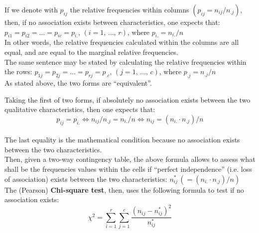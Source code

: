 \begin{frame}
  \vspace*{.25cm}
  If we denote with $ p_{ij} $ the relative frequencies within columns $ (p_{ij} = n_{ij}/n_{.j}) $, then, if no association exists between characteristics, one expects that: $ p_{i1} = p_ {i2} = \dots = p_{ic} = p_{i.} $, $ (i = 1, \, \dots, \, r) $, where $ p_{i.} = n_{i.}/n $\\
  \vspace*{.25cm}
  In other words, the relative frequencies calculated within the columns are all equal, and are equal to the marginal relative frequencies. \\
  \vspace*{.5cm}
  The same sentence may be stated by calculating the relative frequencies within the rows: $ p_{1j} = p_{2j} = \dots = p_{rj} = p_{.c} $, $(j = 1, \, \dots, \, c) $, where $ p_{.j} = n_{.j}/n $\\
  \vspace*{.5cm}
  As stated above, the two forms are ``equivalent''.
\end{frame}

\begin{frame}
  \vspace*{.05cm}
  Taking the first of two forms, if absolutely no association exists between the two qualitative characteristics, then one expects that:\\
  \vspace*{-.3cm}
  $$ p_{ij}=p_{i.} \Longleftrightarrow n_{ij}/n_{.j} = n_{i.}/n  \Longleftrightarrow n_{ij} = (n_{i.} \cdot n_{.j})/n $$\\
  \vspace*{.1cm}
  The last equality is the mathematical condition because no association exists between the two characteristics.\\
  Then, given a two-way contingency table, the above formula allows to assess what shall be the frequencies values within the cells if ``perfect independence'' (i.e. loss of association) exists between the two characteristics: $ n_{ij}^* \, ( = (n_{i.} \cdot n_{.j})/n) $\\
  The (Pearson) \textbf{Chi-square test}, then, uses the following formula to test if no association exists:
  $$ \chi^2 = \sum_{i=1}^r \sum_{j=1}^c{\frac{(n_{ij}-n_{ij}^*)^2}{n_{ij}^*}} $$
\end{frame}

